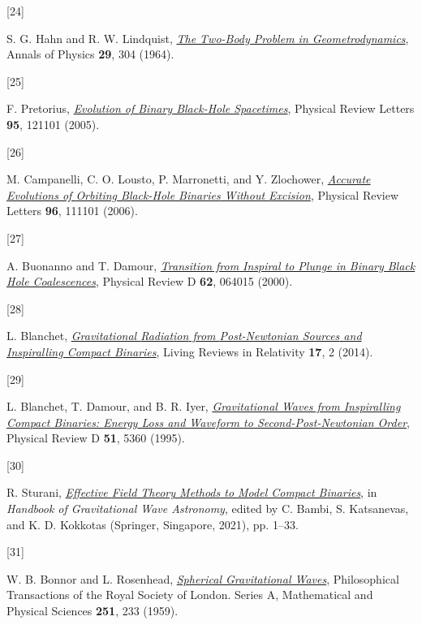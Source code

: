 \documentclass[
  10pt,
  a4paper,
  DIV=11,
  numbers=noendperiod,
  twoside]{scrreprt}
\newlength{\cslhangindent}
\newlength{\csllabelwidth}
\newlength{\cslentryspacingunit} %
\newenvironment{CSLReferences}[2] %
 {%
  \setlength{\parindent}{0pt}
  \ifodd #1
  \let\oldpar\par
  \def\par{\hangindent=\cslhangindent\oldpar}
  \fi
  \setlength{\parskip}{#2\cslentryspacingunit}
 }%
 {}
\newcommand{\CSLLeftMargin}[1]{\parbox[t]{\csllabelwidth}{#1}}
\newcommand{\CSLRightInline}[1]{\parbox[t]{\linewidth - \csllabelwidth}{#1}\break}
\DeclareRobustCommand{\[}{\begin{equation}}
\DeclareRobustCommand{\]}{\end{equation}}
\begin{document}
\begin{CSLReferences}{0}{0}
\leavevmode{}%
\CSLLeftMargin{{[}24{]} }%
\CSLRightInline{S. G. Hahn and R. W. Lindquist,
\emph{\href{https://doi.org/10.1016/0003-4916(64)90223-4}{The Two-Body
Problem in Geometrodynamics}}, Annals of Physics \textbf{29}, 304
(1964).}

\leavevmode{}%
\CSLLeftMargin{{[}25{]} }%
\CSLRightInline{F. Pretorius,
\emph{\href{https://doi.org/10.1103/PhysRevLett.95.121101}{Evolution of
{Binary Black-Hole Spacetimes}}}, Physical Review Letters \textbf{95},
121101 (2005).}

\leavevmode{}%
\CSLLeftMargin{{[}26{]} }%
\CSLRightInline{M. Campanelli, C. O. Lousto, P. Marronetti, and Y.
Zlochower,
\emph{\href{https://doi.org/10.1103/PhysRevLett.96.111101}{Accurate
{Evolutions} of {Orbiting Black-Hole Binaries} Without {Excision}}},
Physical Review Letters \textbf{96}, 111101 (2006).}

\leavevmode{}%
\CSLLeftMargin{{[}27{]} }%
\CSLRightInline{A. Buonanno and T. Damour,
\emph{\href{https://doi.org/10.1103/PhysRevD.62.064015}{Transition from
Inspiral to Plunge in Binary Black Hole Coalescences}}, Physical Review
D \textbf{62}, 064015 (2000).}

\leavevmode{}%
\CSLLeftMargin{{[}28{]} }%
\CSLRightInline{L. Blanchet,
\emph{\href{https://doi.org/10.12942/lrr-2014-2}{Gravitational
{Radiation} from {Post-Newtonian Sources} and {Inspiralling Compact
Binaries}}}, Living Reviews in Relativity \textbf{17}, 2 (2014).}

\leavevmode{}%
\CSLLeftMargin{{[}29{]} }%
\CSLRightInline{L. Blanchet, T. Damour, and B. R. Iyer,
\emph{\href{https://doi.org/10.1103/PhysRevD.51.5360}{Gravitational
Waves from Inspiralling Compact Binaries: {Energy} Loss and Waveform to
Second-Post-{Newtonian} Order}}, Physical Review D \textbf{51}, 5360
(1995).}

\leavevmode{}%
\CSLLeftMargin{{[}30{]} }%
\CSLRightInline{R. Sturani,
\emph{\href{https://doi.org/10.1007/978-981-15-4702-7_32-1}{Effective
{Field Theory Methods} to {Model Compact Binaries}}}, in \emph{Handbook
of {Gravitational Wave Astronomy}}, edited by C. Bambi, S. Katsanevas,
and K. D. Kokkotas ({Springer}, {Singapore}, 2021), pp. 1--33.}

\leavevmode{}%
\CSLLeftMargin{{[}31{]} }%
\CSLRightInline{W. B. Bonnor and L. Rosenhead,
\emph{\href{https://doi.org/10.1098/rsta.1959.0003}{Spherical
Gravitational Waves}}, Philosophical Transactions of the Royal Society
of London. Series A, Mathematical and Physical Sciences \textbf{251},
233 (1959).}


\end{CSLReferences}
\end{document}
